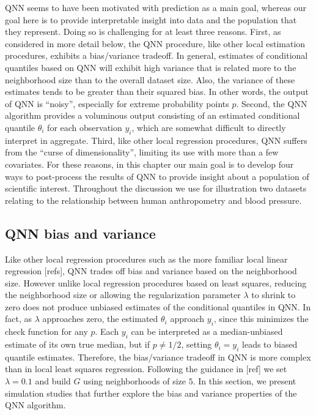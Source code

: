 QNN seems to have been motivated with prediction as a main goal,
whereas our goal here is to provide interpretable insight into data
and the population that they represent.  Doing so is challenging for
at least three reasons.  First, as considered in more detail below,
the QNN procedure, like other local estimation procedures, exhibits a
bias/variance tradeoff.  In general, estimates of conditional quantiles
based on QNN will exhibit high variance that is related more to the
neighborhood size than to the overall dataset size.  Also, the variance
of these estimates tends to be greater than their squared bias.  In other
words, the output of QNN is ``noisy'', especially for extreme probability
points $p$.  Second, the QNN algorithm provides a voluminous output
consisting of an estimated conditional quantile $\theta_i$ for each
observation $y_i$, which are somewhat difficult to directly interpret
in aggregate.  Third, like other local regression procedures, QNN suffers
from the ``curse of dimensionality'', limiting its use with more than a
few covariates.  For these reasons, in this chapter our main goal is to
develop four ways to post-process the results of QNN to provide insight
about a population of scientific interest.  Throughout the discussion we
use for illustration two datasets relating to the relationship between
human anthropometry and blood pressure.

\subsection{QNN bias and variance}

Like other local regression procedures such as the more familiar local
linear regression [refs], QNN trades off bias and variance based on
the neighborhood size.  However unlike local regression procedures
based on least squares, reducing the neighborhood size or allowing the
regularization parameter $\lambda$ to shrink to zero does not produce
unbiased estimates of the conditional quantiles in QNN.  In fact, as
$\lambda$ approaches zero, the estimated $\theta_i$ approach $y_i$,
since this minimizes the check function for any $p$.  Each $y_i$ can
be interpreted as a median-unbiased estimate of its own true median,
but if $p\ne 1/2$, setting $\theta_i = y_i$ leads to biased quantile
estimates.  Therefore, the bias/variance tradeoff in QNN is more complex
than in local least squares regression.  Following the guidance in [ref]
we set $\lambda=0.1$ and build $G$ using neighborhoods of size $5$.
In this section, we present simulation studies that further explore the
bias and variance properties of the QNN algorithm.

